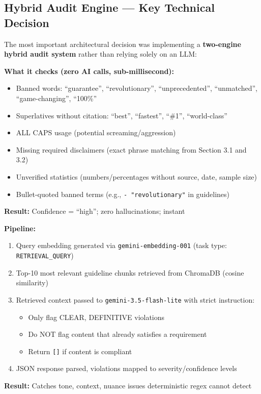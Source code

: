 \documentclass[11pt,a4paper]{article}
\begin{document}
\subsection{Hybrid Audit Engine --- Key Technical Decision}

The most important architectural decision was implementing a \textbf{two-engine hybrid audit system} rather than relying solely on an LLM:

\begin{tcolorbox}[colback=lightgray, colframe=primaryblue, arc=2mm, boxrule=0.5pt, title=\textbf{Engine 1: Deterministic Rules (deterministic.py)}]
\textbf{What it checks (zero AI calls, sub-millisecond):}
\begin{itemize}[nosep]
    \item Banned words: ``guarantee'', ``revolutionary'', ``unprecedented'', ``unmatched'', ``game-changing'', ``100\%''
    \item Superlatives without citation: ``best'', ``fastest'', ``\#1'', ``world-class''
    \item ALL CAPS usage (potential screaming/aggression)
    \item Missing required disclaimers (exact phrase matching from Section 3.1 and 3.2)
    \item Unverified statistics (numbers/percentages without source, date, sample size)
    \item Bullet-quoted banned terms (e.g., \texttt{- "revolutionary"} in guidelines)
\end{itemize}
\textbf{Result:} Confidence = ``high''; zero hallucinations; instant
\end{tcolorbox}

\vspace{0.5cm}

\begin{tcolorbox}[colback=lightgray, colframe=darkgray, arc=2mm, boxrule=0.5pt, title=\textbf{Engine 2: Gemini Semantic RAG (rag\_engine.py)}]
\textbf{Pipeline:}
\begin{enumerate}[nosep]
    \item Query embedding generated via \texttt{gemini-embedding-001} (task type: \texttt{RETRIEVAL\_QUERY})
    \item Top-10 most relevant guideline chunks retrieved from ChromaDB (cosine similarity)
    \item Retrieved context passed to \texttt{gemini-3.5-flash-lite} with strict instruction:
    \begin{itemize}[nosep]
        \item Only flag CLEAR, DEFINITIVE violations
        \item Do NOT flag content that already satisfies a requirement
        \item Return \texttt{[]} if content is compliant
    \end{itemize}
    \item JSON response parsed, violations mapped to severity/confidence levels
\end{enumerate}
\textbf{Result:} Catches tone, context, nuance issues deterministic regex cannot detect
\end{tcolorbox}
\end{document}
